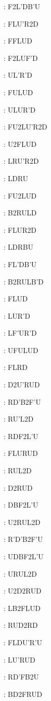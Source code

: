 \documentclass[9pt]{article}
\begin{document}
{\begin{multicols}{6}
: F2L'DB'U

: FLU'R2D

: FFLUD

: F2LUF'D

: UL'R'D

: FULUD

: ULUR'D

: FU2LU'R2D

: U2FLUD

: LRU'R2D

: LDRU

: FU2LUD

: B2RULD

: FLUR2D

: LDRBU

: FL'DB'U

: B2RULB'D

: FLUD

: LUR'D

: LF'UR'D

: UFULUD

: FLRD

: D2U'RUD

: RD'B2F'U

: RU'L2D

: RDF2L'U

: FLURUD

: RUL2D

: D2RUD

: DBF2L'U

: U2RUL2D

: R'D'B2F'U

: UDBF2L'U

: URUL2D

: U2D2RUD

: LB2FLUD

: RUD2RD

: FLDU'R'U

: LU'RUD

: RD'FB2U

: BD2FRUD


\end{multicols}}
\end{document}
